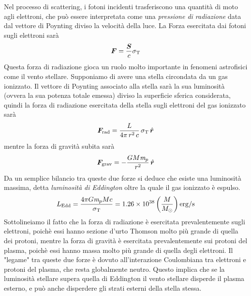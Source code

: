 Nel processo di scattering, i fotoni incidenti trasferiscono una quantità di moto agli elettroni, che può essere interpretata come una \textit{pressione di radiazione} data dal vettore di Poynting diviso la velocità della luce. La Forza esercitata dai fotoni sugli elettroni sarà
\begin{equation}
\V{F} = \dfrac{\V{S}}{c}\sigma_\mathrm{T}
\end{equation}
Questa forza di radiazione gioca un ruolo molto importante in fenomeni astrofisici come il vento stellare. Supponiamo di avere una stella circondata da un gas ionizzato. Il vettore di Poynting associato alla stella sarà la sua luminosità (ovvera la sua potenza totale emessa) diviso la superficie sferica considerata, quindi la forza di radiazione esercitata della stella sugli elettroni del gas ionizzato sarà
\begin{equation}
\V{F_\mathrm{rad}} = \dfrac{L}{4\pi\,r^2 \, c}\,\sigma_\mathrm{T} \, \vers{r}
\end{equation}
mentre la forza di gravità subita sarà
\begin{equation}
\V{F}_\mathrm{grav} = -\dfrac{GM\mpr}{r^2}\,\vers{r}
\end{equation}
Da un semplice bilancio tra queste due forze si deduce che esiste una luminosità massima, detta \textit{luminosità di Eddington} oltre la quale il gas ionizzato è espulso.
\begin{equation}
L_\mathrm{Edd}= \dfrac{4\pi G \textit{m}_{p} M c}{\sigma_\mathrm{T}} = 1.26\times10^{38} \left( \dfrac{M}{M_\odot} \right) \mathrm{erg/s}
\end{equation}
Sottolineiamo il fatto che la forza di radiazione è esercitata prevalentemente sugli elettroni, poichè essi hanno sezione d'urto Thomson molto più grande di quella dei protoni, mentre la forza di gravità è esercitata prevalentemente sui protoni del plasma, poichè essi hanno massa molto più grande di quella degli elettroni. Il "legame" tra queste due forze è dovuto all'interazione Coulombiana tra elettroni e protoni del plasma, che resta globalmente neutro. Questo implica che se la luminosità stellare supera quella di Eddington il vento stellare disperde il plasma esterno, e può anche disperdere gli strati esterni della stella stessa.

